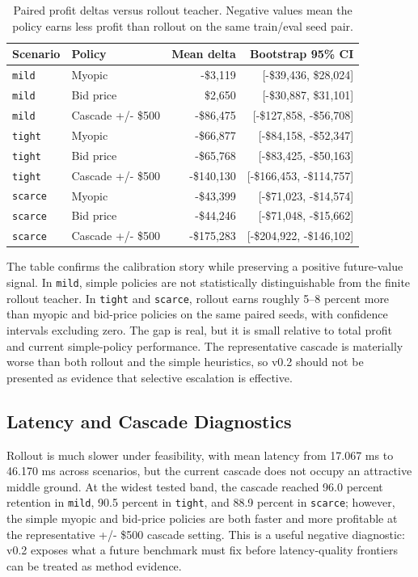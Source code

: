 \documentclass[11pt]{article}
\begin{document}
\begin{table}[t]
\centering
\caption{Paired profit deltas versus rollout teacher. Negative values mean the
policy earns less profit than rollout on the same train/eval seed pair.}
\small
\begin{tabular}{llrr}
\toprule
Scenario & Policy & Mean delta & Bootstrap 95\% CI \\
\midrule
\texttt{mild} & Myopic & -\$3,119 & [-\$39,436, \$28,024] \\
\texttt{mild} & Bid price & \$2,650 & [-\$30,887, \$31,101] \\
\texttt{mild} & Cascade +/- \$500 & -\$86,475 & [-\$127,858, -\$56,708] \\
\texttt{tight} & Myopic & -\$66,877 & [-\$84,158, -\$52,347] \\
\texttt{tight} & Bid price & -\$65,768 & [-\$83,425, -\$50,163] \\
\texttt{tight} & Cascade +/- \$500 & -\$140,130 & [-\$166,453, -\$114,757] \\
\texttt{scarce} & Myopic & -\$43,399 & [-\$71,023, -\$14,574] \\
\texttt{scarce} & Bid price & -\$44,246 & [-\$71,048, -\$15,662] \\
\texttt{scarce} & Cascade +/- \$500 & -\$175,283 & [-\$204,922, -\$146,102] \\
\bottomrule
\end{tabular}
\label{tab:paired-deltas}
\end{table}

The table confirms the calibration story while preserving a positive
future-value signal. In \texttt{mild}, simple policies are not statistically
distinguishable from the finite rollout teacher. In \texttt{tight} and
\texttt{scarce}, rollout earns roughly 5--8 percent more than myopic and
bid-price policies on the same paired seeds, with confidence intervals
excluding zero. The gap is real, but it is small relative to total profit and
current simple-policy performance. The representative cascade is materially
worse than both rollout and the simple heuristics, so v0.2 should not be
presented as evidence that selective escalation is effective.

\subsection{Latency and Cascade Diagnostics}

Rollout is much slower under feasibility, with mean latency from 17.067 ms to
46.170 ms across scenarios, but the current cascade does not occupy an
attractive middle ground. At the widest tested band, the cascade reached 96.0
percent retention in \texttt{mild}, 90.5 percent in \texttt{tight}, and 88.9
percent in \texttt{scarce}; however, the simple myopic and bid-price policies
are both faster and more profitable at the representative +/- \$500 cascade
setting. This is a useful negative diagnostic: v0.2 exposes what a future
benchmark must fix before latency-quality frontiers can be treated as method
evidence.
\end{document}
